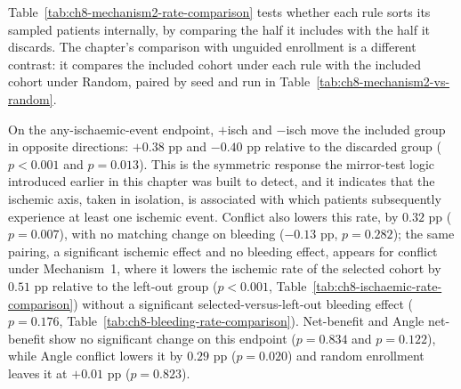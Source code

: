 \begin{table}[htbp]
\centering
\small
\setlength{\tabcolsep}{5pt}

\caption{Bleeding and any-ischaemic-event rates among patients included in and
discarded from the cohort under Mechanism 2, by selection policy, averaged over 100
seeded replications of 1,789 included against 1,790 discarded.
An ischaemic event denotes the occurrence of at least one of death, MI or stroke, with
each patient counted once. Diff.\ is the included-minus-discarded difference; SEM
is the standard error of the paired per-run differences; $p$ is from a
paired two-sided Wilcoxon signed-rank test on the per-replication included-minus-discarded
difference, the non-parametric counterpart that does not assume the difference is
normally distributed.}
\label{tab:ch8-mechanism2-rate-comparison}
\end{table}

Table~\ref{tab:ch8-mechanism2-rate-comparison} tests whether each rule sorts its sampled
patients internally, by comparing the half it includes with the half it discards. The
chapter's comparison with unguided enrollment is a different contrast: it compares the
included cohort under each rule with the included cohort under Random, paired by seed and
run in Table~\ref{tab:ch8-mechanism2-vs-random}.

\begin{table}[htbp]
\centering
\small
\setlength{\tabcolsep}{4pt}

\caption{Direct comparison of the post-seed cohort selected by each Mechanism~2 policy
with the post-seed cohort selected by Random. Results are paired by run over 100 seeded
replications. Differences are policy minus Random; SEM and the two-sided Wilcoxon test use
the paired per-run differences.}
\label{tab:ch8-mechanism2-vs-random}
\end{table}

On the any-ischaemic-event endpoint, $+$isch and $-$isch move the included group in
opposite directions: $+0.38$ pp and $-0.40$ pp relative to the discarded group
($p<0.001$ and $p=0.013$). This is the symmetric response the mirror-test logic
introduced earlier in this chapter was built to detect, and it indicates that the
ischemic axis, taken in isolation, is associated with which patients subsequently
experience at least one ischemic event. Conflict also lowers this rate, by $0.32$ pp
($p=0.007$), with no matching change on bleeding ($-0.13$ pp, $p=0.282$); the same
pairing, a significant ischemic effect and no bleeding effect, appears for conflict
under Mechanism~1, where it lowers the ischemic rate of the selected cohort by $0.51$
pp relative to the left-out group ($p<0.001$,
Table~\ref{tab:ch8-ischaemic-rate-comparison}) without a significant
selected-versus-left-out bleeding effect ($p=0.176$,
Table~\ref{tab:ch8-bleeding-rate-comparison}). Net-benefit and Angle net-benefit show
no significant change on this endpoint ($p=0.834$ and $p=0.122$), while Angle conflict
lowers it by $0.29$ pp ($p=0.020$) and random enrollment leaves it at $+0.01$ pp
($p=0.823$).

